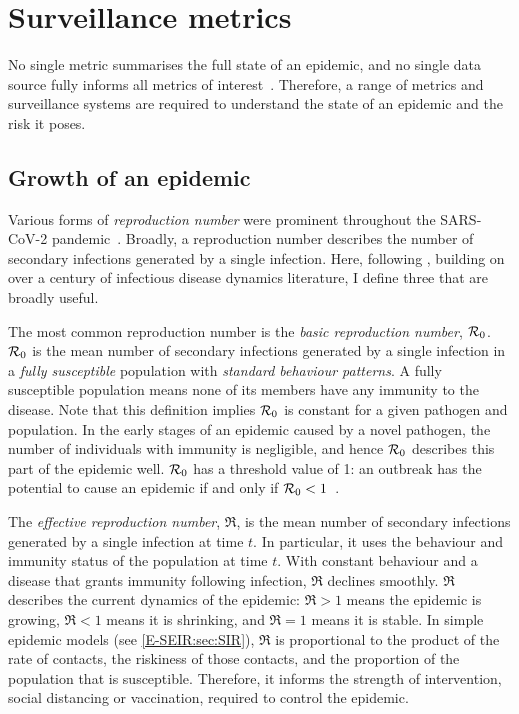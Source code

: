 \documentclass[thesis.tex]{subfiles}
\begin{document}
\section{Surveillance metrics}

No single metric summarises the full state of an epidemic, and no single data source fully informs all metrics of interest~\autocite{royalSocietyRnumber,pellisEstimation,paragGrowthRates}.
Therefore, a range of metrics and surveillance systems are required to understand the state of an epidemic and the risk it poses.

\subsection{Growth of an epidemic}

Various forms of \emph{reproduction number} were prominent throughout the SARS-CoV-2 pandemic~\autocite{pellisEstimation}.
Broadly, a reproduction number describes the number of secondary infections generated by a single infection.
Here, following \textcite{pellisEstimation},  building on over a century of infectious disease dynamics literature, I define three that are broadly useful.

The most common reproduction number is the \emph{basic reproduction number}, $\mathcal{R}_{0}$.
$\mathcal{R}_{0}$ is the mean number of secondary infections generated by a single infection in a \emph{fully susceptible} population with \emph{standard behaviour patterns}.
A fully susceptible population means none of its members have any immunity to the disease.
Note that this definition implies $\mathcal{R}_{0}$ is constant for a given pathogen and population.
In the early stages of an epidemic caused by a novel pathogen, the number of individuals with immunity is negligible, and hence $\mathcal{R}_{0}$ describes this part of the epidemic well.
$\mathcal{R}_{0}$ has a threshold value of 1: an outbreak has the potential to cause an epidemic if and only if $\mathcal{R}_{0} < 1$~\autocite[76]{diekmannMathematical}.

The \emph{effective reproduction number}, $\Re$, is the mean number of secondary infections generated by a single infection at time $t$.
In particular, it uses the behaviour and immunity status of the population at time $t$.
With constant behaviour and a disease that grants immunity following infection, $\Re$ declines smoothly.
$\Re$ describes the current dynamics of the epidemic: $\Re > 1$ means the epidemic is growing, $\Re < 1$ means it is shrinking, and $\Re = 1$ means it is stable.
In simple epidemic models (see \cref{E-SEIR:sec:SIR}), $\Re$ is proportional to the product of the rate of contacts, the riskiness of those contacts, and the proportion of the population that is susceptible.
Therefore, it informs the strength of intervention, \eg social distancing or vaccination, required to control the epidemic.
\end{document}
